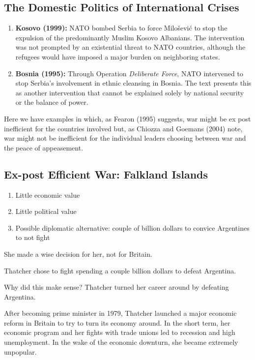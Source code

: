 \subsection{The Domestic Politics of International Crises}
\begin{enumerate}
    \item \textbf{Kosovo (1999):} NATO bombed Serbia to force Milošević to stop the expulsion of the predominantly Muslim Kosovo Albanians. The intervention was not prompted by an existential threat to NATO countries, although the refugees would have imposed a major burden on neighboring states.
    \item \textbf{Bosnia (1995):} Through Operation \textit{Deliberate Force}, NATO intervened to stop Serbia’s involvement in ethnic cleansing in Bosnia. The text presents this as another intervention that cannot be explained solely by national security or the balance of power.
\end{enumerate}

Here we have examples in which, as Fearon (1995) suggests, war might be ex post inefficient for the countries involved but, as Chiozza and Goemans (2004) note, war might not be inefficient for the individual leaders choosing between war and the peace of appeasement.

\subsection{Ex-post Efficient War: Falkland Islands}
\begin{enumerate}
    \item Little economic value
    \item Little political value
    \item Possible diplomatic alternative: couple of billion dollars to convice Argentines to not fight
\end{enumerate}
She made a wise decision for her, not for Britain.

Thatcher chose to fight spending a couple billion dollars to defeat Argentina.

Why did this make sense? Thatcher turned her career around by defeating Argentina.

After becoming prime minister in 1979, Thatcher launched a major economic reform in Britain to try to turn its economy around. In the short term, her economic program and her fights with trade unions led to recession and high unemployment. In the wake of the economic downturn, she became extremely unpopular.

